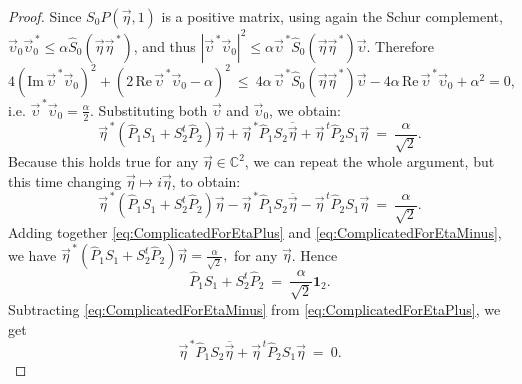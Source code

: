 \documentclass[12pt]{article}
\theoremstyle{plain}
\theoremstyle{definition}
\theoremstyle{remark}
\numberwithin{equation}{section}
\begin{document}
\begin{proof}
Since $S_{0} P(\vec{\eta},1)$ is a positive matrix, 
using again the Schur complement,
$\vec{\upsilon}_{0} \vec{\upsilon}_{0}^{\,*} \leq  \alpha \hat{S}_{0}(\vec{\eta} \vec{\eta}^{\,*})$,
and thus
$|\vec{\upsilon}^{\,*} \vec{\upsilon}_{0}|^{2} \leq
  \alpha \vec{\upsilon}^{\,*} \hat{S}_{0}(\vec{\eta} \vec{\eta}^{\,*}) \vec{\upsilon}$.
Therefore
\begin{equation}
4 \left( \text{Im} \, \vec{\upsilon}^{\,*} \vec{\upsilon}_{0} \right)^{2} +
\left( 2 \, \text{Re} \, \vec{\upsilon}^{\,*} \vec{\upsilon}_{0} - \alpha \right)^{2} 
 \: \leq \:
4 \alpha \, \vec{\upsilon}^{\,*} \hat{S}_{0}(\vec{\eta} \vec{\eta}^{\,*}) \vec{\upsilon}
    - 4 \alpha \, \text{Re} \, \vec{\upsilon}^{\,*} \vec{\upsilon}_{0} + \alpha^{2}  = 0,
\end{equation}
i.e. $\vec{\upsilon}^{\,*} \vec{\upsilon}_{0} = \frac{\alpha}{2}$.
Substituting both $\vec{\upsilon}$ and $\vec{\upsilon}_{0}$,
we obtain:
\begin{equation}
\label{eq:ComplicatedForEtaPlus}
\vec{\eta}^{\,*} \left( \hat{P}_{1} S_{1} + S_{2}^{t} \hat{P}_{2} \right) \vec{\eta}
    + \vec{\eta}^{\,*} \hat{P}_{1} S_{2} \overline{\vec{\eta}} 
    + \vec{\eta}^{\,t} \hat{P}_{2} S_{1} \vec{\eta} \: = \: \frac{\alpha}{\sqrt{2}}.
\end{equation}
Because this holds true for any $\vec{\eta} \in \mathbb{C}^{2}$,
we can repeat the whole argument,
but this time changing $\vec{\eta} \mapsto i \vec{\eta}$,
to obtain:
\begin{equation}
\label{eq:ComplicatedForEtaMinus}
\vec{\eta}^{\,*} \left( \hat{P}_{1} S_{1} + S_{2}^{t} \hat{P}_{2} \right) \vec{\eta}
    - \vec{\eta}^{\,*} \hat{P}_{1} S_{2} \overline{\vec{\eta}}
    - \vec{\eta}^{\,t} \hat{P}_{2} S_{1} \vec{\eta} \: = \: \frac{\alpha}{\sqrt{2}}.
\end{equation}
Adding together \eqref{eq:ComplicatedForEtaPlus} and \eqref{eq:ComplicatedForEtaMinus},
we have
$
\vec{\eta}^{\,*} \left( \hat{P}_{1} S_{1} + S_{2}^{t} \hat{P}_{2} \right) \vec{\eta} = 
    \frac{\alpha}{\sqrt{2}},
$
for any $\vec{\eta}$. 
Hence 
\begin{equation}
\label{eq:S1PlusS2EqualsOne}
\hat{P}_{1} S_{1} + S_{2}^{t} \hat{P}_{2} \: = \:
     \frac{\alpha}{\sqrt{2}} \mathbf{1}_{2}.
\end{equation}
Subtracting \eqref{eq:ComplicatedForEtaMinus} from \eqref{eq:ComplicatedForEtaPlus},
we get
\begin{equation}
    \vec{\eta}^{\,*} \hat{P}_{1} S_{2} \overline{\vec{\eta}} 
    + \vec{\eta}^{\,t} \hat{P}_{2} S_{1} \vec{\eta} \: = \: 0.

\end{equation}
\end{proof}
\end{document}
